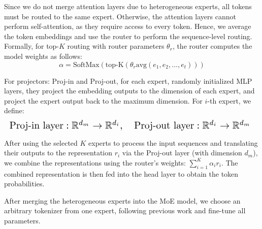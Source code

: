 
Since we do not merge attention layers due to heterogeneous experts, all tokens must be routed to the same expert. Otherwise, the attention layers cannot perform self-attention, as they require access to every token. Hence, we average the token embeddings and use the router to perform the sequence-level routing. Formally, for top-$K$ routing with router parameters $\theta_r$, the router computes the model weights as follows:
\begin{equation*}
    \alpha = \text{SoftMax}(\text{top-K}(\theta_r \text{avg}(e_1, e_2, \dots, e_t)))
\end{equation*}

For projectors: Proj-in and Proj-out, for each expert, randomly initialized MLP layers, they project the embedding outputs to the dimension of each expert, and project the expert output back to the maximum dimension. For $i$-th expert, we define:
\begin{equation*}
\resizebox{\columnwidth}{!}{%
$
\text{Proj-in layer}: \mathbb{R}^{d_m} \rightarrow \mathbb{R}^{d_i}, \quad \text{Proj-out layer}: \mathbb{R}^{d_i} \rightarrow \mathbb{R}^{d_m}
$
}
\end{equation*}


After using the selected $K$ experts to process the input sequences and translating their outputs to the representation $r_i$ via the Proj-out layer (with dimension $d_m$), we combine the representations using the router's weights: $\sum_{i=1}^K \alpha_i r_i$. The combined representation is then fed into the head layer to obtain the token probabilities. 

After merging the heterogeneous experts into the MoE model, we choose an arbitrary tokenizer from one expert, following previous work \cite{roberts2024pretrained} and fine-tune all parameters.
